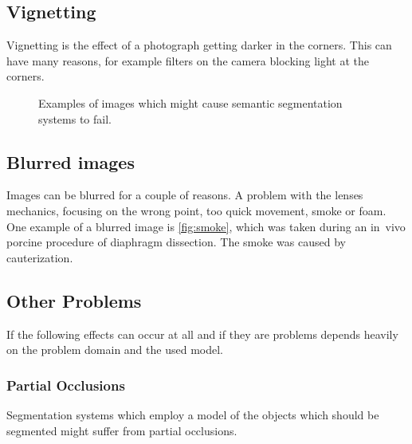 \documentclass[technote,a4paper,leqno]{IEEEtran}
\begin{document}
\subsection{Vignetting}
Vignetting is the effect of a photograph getting darker in the corners. This
can have many reasons, for example filters on the camera blocking light at the
corners.
\begin{figure}
\centering
{}%
%
%
\caption{Examples of images which might cause semantic segmentation systems to fail.}
\label{fig:test}
\end{figure}
\subsection{Blurred images}
Images can be blurred for a couple of reasons. A problem with the lenses
mechanics, focusing on the wrong point, too quick movement, smoke or foam.
One example of a blurred image is \cref{fig:smoke}, which was taken during an
in~vivo porcine procedure of diaphragm dissection. The smoke was caused by
cauterization.
\subsection{Other Problems}
If the following effects can occur at all and if they are problems depends
heavily on the problem domain and the used model.
\subsubsection{Partial Occlusions}
Segmentation systems which employ a model of the objects which should be
segmented might suffer from partial occlusions.
\end{document}
